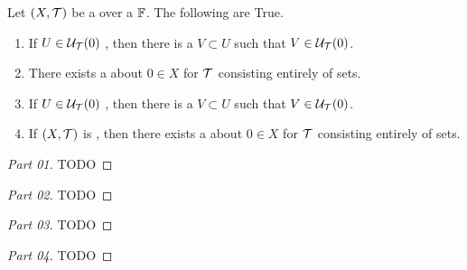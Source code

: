 \begin{prop}
    \label{prop:ExistenceOfBalancedNeighborhoods}
    Let $(X,\mathcal{T})$ be a 
    \TVS
    over a 
    \Field
    $\mathbb{F}$.
    The following are True. 
    \begin{enumerate}
        \item If 
            $U \in \mathcal{U}_{\mathcal{T}}(0)$
            , then there is a 
            \BalancedSet
            $V \subset U$
            such that 
            $V \in \mathcal{U}_{\mathcal{T}}(0)$.
        \item There exists a 
            \NeighborhoodBasis
            about $0 \in X$ 
            for $\mathcal{T}$ 
            consisting entirely 
            of \BalancedSet sets. 
        \item If 
            $U \in \mathcal{U}_{\mathcal{T}}(0)$
            , then there is a 
            \BalancedSet
            $V \subset U$
            such that 
            $V \in \mathcal{U}_{\mathcal{T}}(0)$.
        \item If $(X,\mathcal{T})$ is 
            \LocallyConvex, 
            then there exists a 
            \NeighborhoodBasis
            about $0 \in X$ 
            for $\mathcal{T}$ 
            consisting entirely 
            of 
            \BalancedSet
            sets.
    \end{enumerate}

    \begin{proof}[Part 01] TODO
    \end{proof}
    \begin{proof}[Part 02] TODO
    \end{proof}
    \begin{proof}[Part 03] TODO
    \end{proof}
    \begin{proof}[Part 04] TODO
    \end{proof}
\end{prop}
